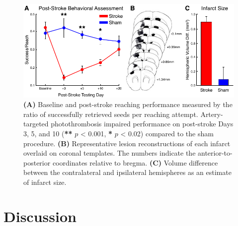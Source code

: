 \begin{figure}
    \includegraphics{figures/chapter_3/functionalimpairment.pdf}
    \caption{
        \label{fig:functionalimpairment}
        \textbf{(A)} Baseline and post-stroke reaching performance measured by the ratio of successfully retrieved seeds per reaching attempt. Artery-targeted photothrombosis impaired performance on post-stroke Days 3, 5, and 10 (\textbf{**} $p$ \textless{} 0.001, \textbf{*} $p$ \textless{} 0.02) compared to the sham procedure. \textbf{(B)} Representative lesion reconstructions of each infarct overlaid on coronal templates. The numbers indicate the anterior-to-posterior coordinates relative to bregma. \textbf{(C)} Volume difference between the contralateral and ipsilateral hemispheres as an estimate of infarct size.
    }
\end{figure}



\section{Discussion}

\blindtext



